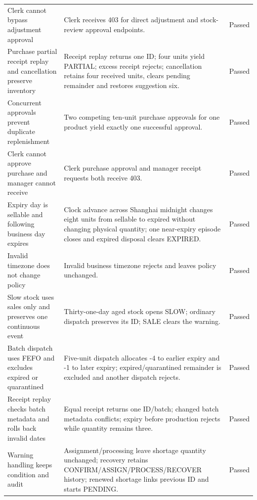 \begin{longtable}{>{\raggedright\arraybackslash}p{}>{\raggedright\arraybackslash}p{}>{\raggedright\arraybackslash}p{}}
\leavevmode{}Clerk cannot bypass adjustment approval & \leavevmode{}Clerk receives 403 for direct adjustment and stock-review approval endpoints. & \leavevmode{}Passed \\
\leavevmode{}Purchase partial receipt replay and cancellation preserve inventory & \leavevmode{}Receipt replay returns one ID; four units yield PARTIAL; excess receipt rejects; cancellation retains four received units, clears pending remainder and restores suggestion six. & \leavevmode{}Passed \\
\leavevmode{}Concurrent approvals prevent duplicate replenishment & \leavevmode{}Two competing ten-unit purchase approvals for one product yield exactly one successful approval. & \leavevmode{}Passed \\
\leavevmode{}Clerk cannot approve purchase and manager cannot receive & \leavevmode{}Clerk purchase approval and manager receipt requests both receive 403. & \leavevmode{}Passed \\
\leavevmode{}Expiry day is sellable and following business day expires & \leavevmode{}Clock advance across Shanghai midnight changes eight units from sellable to expired without changing physical quantity; one near-expiry episode closes and expired disposal clears EXPIRED. & \leavevmode{}Passed \\
\leavevmode{}Invalid timezone does not change policy & \leavevmode{}Invalid business timezone rejects and leaves policy unchanged. & \leavevmode{}Passed \\
\leavevmode{}Slow stock uses sales only and preserves one continuous event & \leavevmode{}Thirty-one-day aged stock opens SLOW; ordinary dispatch preserves its ID; SALE clears the warning. & \leavevmode{}Passed \\
\leavevmode{}Batch dispatch uses FEFO and excludes expired or quarantined & \leavevmode{}Five-unit dispatch allocates -4 to earlier expiry and -1 to later expiry; expired/\allowbreak{}quarantined remainder is excluded and another dispatch rejects. & \leavevmode{}Passed \\
\leavevmode{}Receipt replay checks batch metadata and rolls back invalid dates & \leavevmode{}Equal receipt returns one ID/\allowbreak{}batch; changed batch metadata conflicts; expiry before production rejects while quantity remains three. & \leavevmode{}Passed \\
\leavevmode{}Warning handling keeps condition and audit & \leavevmode{}Assignment/\allowbreak{}processing leave shortage quantity unchanged; recovery retains CONFIRM/\allowbreak{}ASSIGN/\allowbreak{}PROCESS/\allowbreak{}RECOVER history; renewed shortage links previous ID and starts PENDING. & \leavevmode{}Passed \\

\end{longtable}
